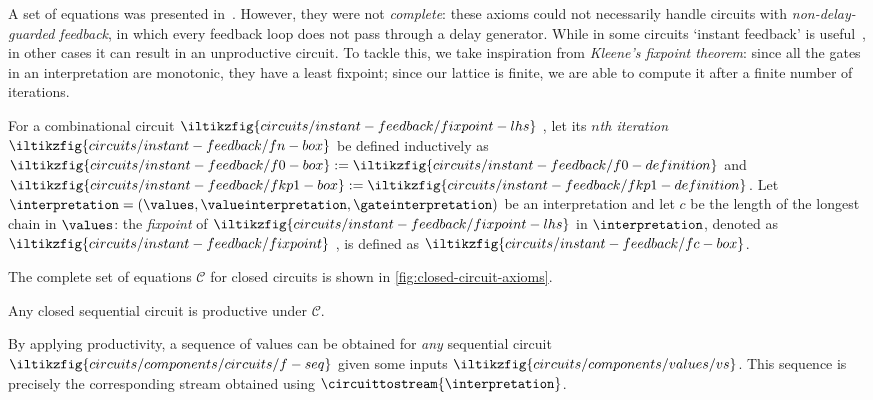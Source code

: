 \documentclass[10pt]{article}
\begin{document}
    \noindent
    A set of equations was presented in~\cite{ghica2016categorical}.
    However, they were not \emph{complete}: these axioms could not necessarily handle circuits with \emph{non-delay-guarded feedback}, in which every feedback loop does not pass through a delay generator.
    While in some circuits `instant feedback' is useful~\cite{riedel2004cyclic,mendler2012constructive}, in other cases it can result in an unproductive circuit.
    To tackle this, we take inspiration from \emph{Kleene's fixpoint theorem}: since all the gates in an interpretation are monotonic, they have a least fixpoint; since our lattice is finite, we are able to compute it after a finite number of iterations.

    \begin{definition}
    
        For a combinational circuit 
        \(\iltikzfig{circuits/instant-feedback/fixpoint-lhs}\)
        , let its \emph{\(n\)th iteration} 
        \(\iltikzfig{circuits/instant-feedback/fn-box}\) 
        be defined inductively as 
        \(
            \iltikzfig{circuits/instant-feedback/f0-box} 
            := 
            \iltikzfig{circuits/instant-feedback/f0-definition}
        \) 
        and 
        \(
            \iltikzfig{circuits/instant-feedback/fkp1-box} 
            := 
            \iltikzfig{circuits/instant-feedback/fkp1-definition}
        \).
        Let \(\interpretation = (\values,\valueinterpretation,\gateinterpretation)\) be an interpretation and let \(c\) be the length of the longest chain in \(\values\): the \emph{fixpoint} of 
        \(\iltikzfig{circuits/instant-feedback/fixpoint-lhs}\)
        in \(\interpretation\), denoted as 
        \(\iltikzfig{circuits/instant-feedback/fixpoint}\)
        , is defined as \(\iltikzfig{circuits/instant-feedback/fc-box}\).
    \end{definition}

    \noindent
    The complete set of equations \(\mathcal{C}\) for closed circuits is shown in \cref{fig:closed-circuit-axioms}.

    \begin{theorem}
        Any closed sequential circuit  is productive under \(\mathcal{C}\).
    \end{theorem}

    \noindent
    By applying productivity, a sequence of values can be obtained for \emph{any} sequential circuit \(\iltikzfig{circuits/components/circuits/f-seq}\) given some inputs \(\iltikzfig{circuits/components/values/vs}\).
    This sequence is precisely the corresponding stream obtained using \(\circuittostream{\interpretation}\).
\end{document}
